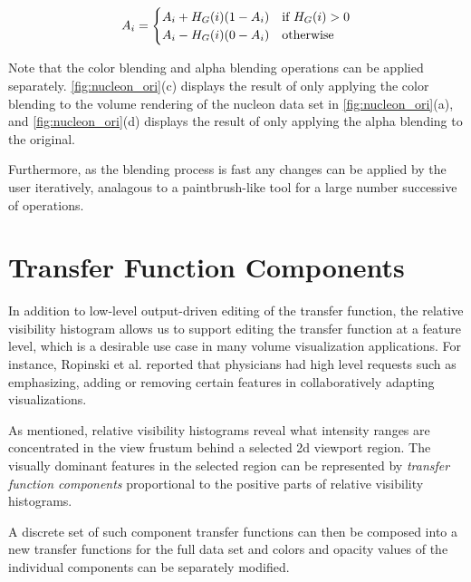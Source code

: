 \documentclass[twoside,twocolumn,10pt]{article}
\begin{document}
\[
A_{i} =
\begin{cases}
A_{i}+H_{G}(i)(1-A_{i}) & \text{if $ H_{G}(i)>0 $} \\
A_{i}-H_{G}(i)(0-A_{i}) & \text{otherwise}
\end{cases}
\]

Note that the color blending and alpha blending operations can be applied separately. \autoref{fig:nucleon_ori}(c) displays the result of only applying the color blending to the volume rendering of the nucleon data set in \autoref{fig:nucleon_ori}(a), and \autoref{fig:nucleon_ori}(d) displays the result of only applying the alpha blending to the original.

Furthermore, as the blending process is fast any changes can be applied by the user iteratively, analagous to a paintbrush-like tool for a large number successive of operations.
 
\section{Transfer Function Components} \label{transfer_function_components}


In addition to low-level output-driven editing of the transfer function, the relative visibility histogram allows us to support editing the transfer function at a feature level, which is a desirable use case in many volume visualization applications. For instance, Ropinski et al. \cite{ropinski_stroke-based_2008} reported that physicians had high level requests such as emphasizing, adding or removing certain features in collaboratively adapting visualizations.

As mentioned, relative visibility histograms reveal what intensity ranges are concentrated in the view frustum behind a selected 2d viewport region. The visually dominant features in the selected region can be represented by \emph{transfer function components} proportional to the positive parts of relative visibility histograms.

A discrete set of such component transfer functions can then be composed into a new transfer functions for the full data set and colors and opacity values of the individual components can be separately modified.

\end{document}
